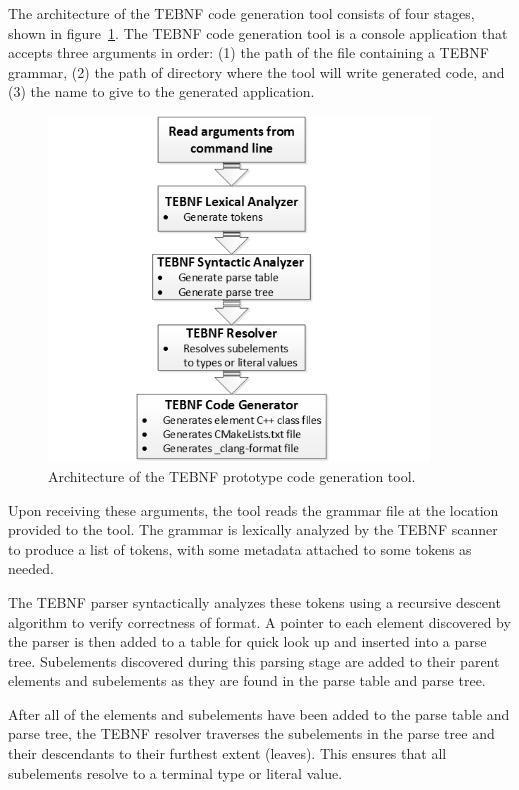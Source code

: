 \indent
The architecture of the TEBNF code generation tool consists of four stages, shown in figure~\ref{fig:TEBNFCodeGenToolArchitecture}.  The TEBNF code generation tool is a console application that accepts three arguments in order: (1) the path of the file containing a TEBNF grammar, (2) the path of directory where the tool will write generated code, and (3) the name to give to the generated application.

\begin{figure}[h!]
\centering
\includegraphics[width=0.9\textwidth]{figures/TEBNFCodeGenToolArchitecture.png}
\caption{Architecture of the TEBNF prototype code generation tool.}
\label{fig:TEBNFCodeGenToolArchitecture}
\end{figure}

\indent
Upon receiving these arguments, the tool reads the grammar file at the location provided to the tool.  The grammar is lexically analyzed by the TEBNF scanner to produce a list of tokens, with some metadata attached to some tokens as needed.

\indent
The TEBNF parser syntactically analyzes these tokens using a recursive descent algorithm to verify correctness of format.  A pointer to each element discovered by the parser is then added to a table for quick look up and inserted into a parse tree.  Subelements discovered during this parsing stage are added to their parent elements and subelements as they are found in the parse table and parse tree.

\indent
After all of the elements and subelements have been added to the parse table and parse tree, the TEBNF resolver traverses the subelements in the parse tree and their descendants to their furthest extent (leaves).  This ensures that all subelements resolve to a terminal type or literal value.

